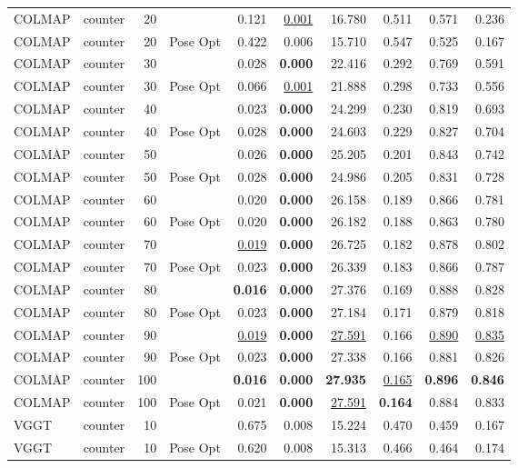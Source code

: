 \begin{table}[H]
\begin{tabular}{llrlrrrrrr}
COLMAP & counter & 20 &  & 0.121 & \underline{0.001} & 16.780 & 0.511 & 0.571 & 0.236 \\
COLMAP & counter & 20 & Pose Opt & 0.422 & 0.006 & 15.710 & 0.547 & 0.525 & 0.167 \\
COLMAP & counter & 30 &  & 0.028 & \textbf{0.000} & 22.416 & 0.292 & 0.769 & 0.591 \\
COLMAP & counter & 30 & Pose Opt & 0.066 & \underline{0.001} & 21.888 & 0.298 & 0.733 & 0.556 \\
COLMAP & counter & 40 &  & 0.023 & \textbf{0.000} & 24.299 & 0.230 & 0.819 & 0.693 \\
COLMAP & counter & 40 & Pose Opt & 0.028 & \textbf{0.000} & 24.603 & 0.229 & 0.827 & 0.704 \\
COLMAP & counter & 50 &  & 0.026 & \textbf{0.000} & 25.205 & 0.201 & 0.843 & 0.742 \\
COLMAP & counter & 50 & Pose Opt & 0.028 & \textbf{0.000} & 24.986 & 0.205 & 0.831 & 0.728 \\
COLMAP & counter & 60 &  & 0.020 & \textbf{0.000} & 26.158 & 0.189 & 0.866 & 0.781 \\
COLMAP & counter & 60 & Pose Opt & 0.020 & \textbf{0.000} & 26.182 & 0.188 & 0.863 & 0.780 \\
COLMAP & counter & 70 &  & \underline{0.019} & \textbf{0.000} & 26.725 & 0.182 & 0.878 & 0.802 \\
COLMAP & counter & 70 & Pose Opt & 0.023 & \textbf{0.000} & 26.339 & 0.183 & 0.866 & 0.787 \\
COLMAP & counter & 80 &  & \textbf{0.016} & \textbf{0.000} & 27.376 & 0.169 & 0.888 & 0.828 \\
COLMAP & counter & 80 & Pose Opt & 0.023 & \textbf{0.000} & 27.184 & 0.171 & 0.879 & 0.818 \\
COLMAP & counter & 90 &  & \underline{0.019} & \textbf{0.000} & \underline{27.591} & 0.166 & \underline{0.890} & \underline{0.835} \\
COLMAP & counter & 90 & Pose Opt & 0.023 & \textbf{0.000} & 27.338 & 0.166 & 0.881 & 0.826 \\
COLMAP & counter & 100 &  & \textbf{0.016} & \textbf{0.000} & \textbf{27.935} & \underline{0.165} & \textbf{0.896} & \textbf{0.846} \\
COLMAP & counter & 100 & Pose Opt & 0.021 & \textbf{0.000} & \underline{27.591} & \textbf{0.164} & 0.884 & 0.833 \\
VGGT & counter & 10 &  & 0.675 & 0.008 & 15.224 & 0.470 & 0.459 & 0.167 \\
VGGT & counter & 10 & Pose Opt & 0.620 & 0.008 & 15.313 & 0.466 & 0.464 & 0.174 \\

\end{tabular}
\end{table}
